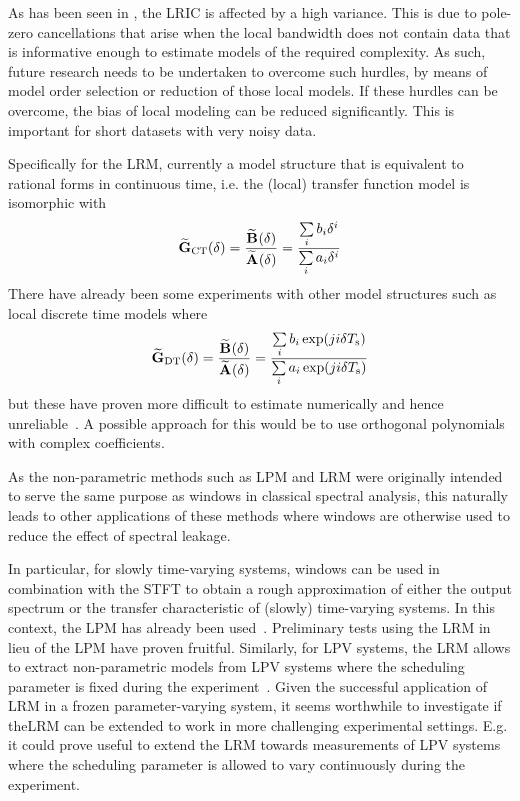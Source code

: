     As has been seen in , the \gls{LRIC} is affected by a high variance.
    This is due to pole-zero cancellations that arise when the local bandwidth does not contain data that is informative enough to estimate models of the required complexity.
    As such, future research needs to be undertaken to overcome such hurdles, by means of model order selection or reduction of those local models.
    If these hurdles can be overcome, the bias of local modeling can be reduced significantly.
    This is important for short datasets with very noisy data.

    Specifically for the \gls{LRM}, currently a model structure that is equivalent to rational forms in continuous time, i.e. the (local) transfer function model is isomorphic with
    \begin{equation}
      \LocalModel[\CT]{G}(\dW) 
      = \frac{\LocalModel{B}(\dW)}{\LocalModel{A}(\dW)}
      = \frac{\Sum_i  b_i \dW^{i}}{\Sum_i  a_i \dW^{i}}
    \end{equation}
    There have already been some experiments with other model structures such as local discrete time models where
    \begin{equation}
      \LocalModel[\DT]{G}(\dW) 
      = \frac{\LocalModel{B}(\dW)}{\LocalModel{A}(\dW)}
      = \frac{\Sum_i  b_i \exp (ji\dW\Ts)}{\Sum_i  a_i \exp (ji\dW\Ts) }
    \end{equation}
    but these have proven more difficult to estimate numerically and hence unreliable~\citep[Section 2.4]{Pintelon2006BJ1}.
    A possible approach for this would be to use orthogonal polynomials~\citep{Forsythe1957,Bultheel2005} with complex coefficients.

    As the non-parametric methods such as \gls{LPM} and \gls{LRM} were originally intended to serve the same purpose as windows in classical spectral analysis, this naturally leads to other applications of these methods where windows are otherwise used to reduce the effect of spectral leakage.

    In particular, for slowly time-varying systems, windows can be used in combination with the \gls{STFT} to obtain a rough approximation of either the output spectrum or the transfer characteristic of (slowly) time-varying systems.
    In this context, the \gls{LPM} has already been used~\citep{Lataire2012}.
    Preliminary tests using the \gls{LRM} in lieu of the \gls{LPM} have proven fruitful.
    Similarly, for \gls{LPV} systems, the \gls{LRM} allows to extract non-parametric models from \gls{LPV} systems where the scheduling parameter is fixed during the experiment~\citep{vanderMaas2015CDC}.
    Given the successful application of \gls{LRM} in a frozen parameter-varying system, it seems worthwhile to investigate if the\gls{LRM} can be extended to work in more challenging experimental settings.
    E.g. it could prove useful to extend the \gls{LRM} towards measurements of \gls{LPV} systems where the scheduling parameter is allowed to vary continuously during the experiment.

